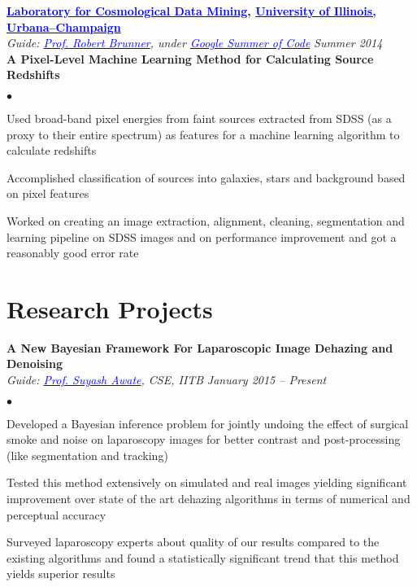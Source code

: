 \documentclass[margin,line]{res}
\newenvironment{list2}{
  \begin{list}{$\bullet$}{%
      \setlength{\itemsep}{0in}
      \setlength{\parsep}{0in} \setlength{\parskip}{0in}
      \setlength{\topsep}{0in} \setlength{\partopsep}{0in} 
      \setlength{\leftmargin}{0.2in}}}{\end{list}}
\begin{document}
\begin{resume}
\vspace*{-0.13in}

{\bf \href{http://lcdm.astro.illinois.edu/}{\textcolor{blue} {Laboratory for Cosmological Data Mining}}, \href{http://www.illinois.edu/}{\textcolor{blue}{University of Illinois, Urbana--Champaign}}} \\
{\em Guide: \href{http://www.astro.illinois.edu/people/bigdog}{\textcolor{blue}{Prof. Robert Brunner}}, under \href{https://www.google-melange.com/gsoc/homepage/google/gsoc2014}{\textcolor{blue} {Google Summer of Code}}} \hfill {\it Summer 2014} \\
\vspace*{-.13in}
\textbf{A Pixel-Level Machine Learning Method for Calculating Source Redshifts} \\
\vspace*{-.01in}
\begin{list2}
\item Used broad-band pixel energies from faint sources extracted from SDSS (as a proxy to their entire spectrum) as features for a machine learning algorithm to calculate redshifts
\item Accomplished classification of sources into galaxies, stars and background based on pixel features
\item Worked on creating an image extraction, alignment, cleaning, segmentation and learning pipeline on SDSS images and on performance improvement and got a reasonably good error rate
\end{list2}

\vspace*{-0.13in}

\section{\sc Research Projects}

{\bf A New Bayesian Framework For Laparoscopic Image Dehazing and Denoising} \\
{\em Guide: \href{https://www.cse.iitb.ac.in/~suyash}{\textcolor{blue}{Prof. Suyash Awate}}, CSE, IITB} \hfill {\it January 2015 -- Present} \\
\vspace*{-.13in}
\begin{list2}
\item Developed a Bayesian inference problem for jointly undoing the effect of surgical smoke and noise on laparoscopy images for better contrast and post-processing (like segmentation and tracking)
\item Tested this method extensively on simulated and real images yielding significant improvement over state of the art dehazing algorithms in terms of numerical and perceptual accuracy
\item Surveyed laparoscopy experts about quality of our results compared to the existing algorithms and found a statistically significant trend that this method yields superior results
\end{list2}


\end{resume}
\end{document}
